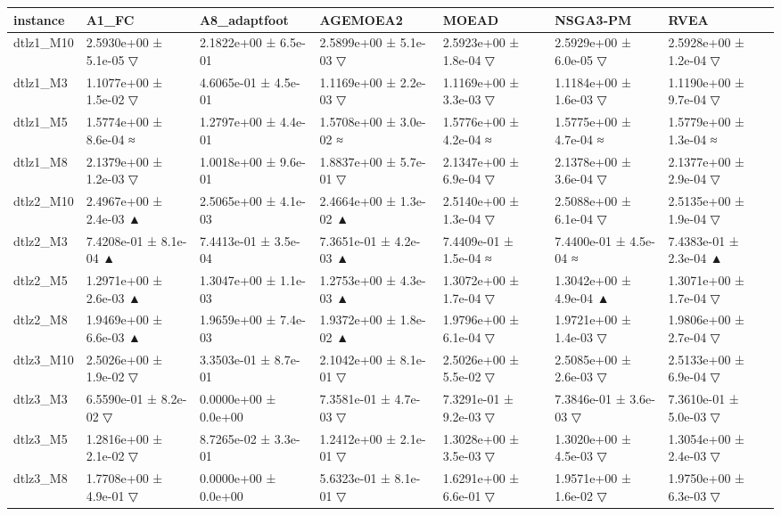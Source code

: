 \begin{tabular}{lllllll}
\toprule
instance & A1\_FC & A8\_adaptfoot & AGEMOEA2 & MOEAD & NSGA3-PM & RVEA \\
\midrule
dtlz1\_M10 & 2.5930e+00 ± 5.1e-05 ▽ & 2.1822e+00 ± 6.5e-01 & 2.5899e+00 ± 5.1e-03 ▽ & 2.5923e+00 ± 1.8e-04 ▽ & 2.5929e+00 ± 6.0e-05 ▽ & 2.5928e+00 ± 1.2e-04 ▽ \\
dtlz1\_M3 & 1.1077e+00 ± 1.5e-02 ▽ & 4.6065e-01 ± 4.5e-01 & 1.1169e+00 ± 2.2e-03 ▽ & 1.1169e+00 ± 3.3e-03 ▽ & 1.1184e+00 ± 1.6e-03 ▽ & 1.1190e+00 ± 9.7e-04 ▽ \\
dtlz1\_M5 & 1.5774e+00 ± 8.6e-04 ≈ & 1.2797e+00 ± 4.4e-01 & 1.5708e+00 ± 3.0e-02 ≈ & 1.5776e+00 ± 4.2e-04 ≈ & 1.5775e+00 ± 4.7e-04 ≈ & 1.5779e+00 ± 1.3e-04 ≈ \\
dtlz1\_M8 & 2.1379e+00 ± 1.2e-03 ▽ & 1.0018e+00 ± 9.6e-01 & 1.8837e+00 ± 5.7e-01 ▽ & 2.1347e+00 ± 6.9e-04 ▽ & 2.1378e+00 ± 3.6e-04 ▽ & 2.1377e+00 ± 2.9e-04 ▽ \\
dtlz2\_M10 & 2.4967e+00 ± 2.4e-03 ▲ & 2.5065e+00 ± 4.1e-03 & 2.4664e+00 ± 1.3e-02 ▲ & 2.5140e+00 ± 1.3e-04 ▽ & 2.5088e+00 ± 6.1e-04 ▽ & 2.5135e+00 ± 1.9e-04 ▽ \\
dtlz2\_M3 & 7.4208e-01 ± 8.1e-04 ▲ & 7.4413e-01 ± 3.5e-04 & 7.3651e-01 ± 4.2e-03 ▲ & 7.4409e-01 ± 1.5e-04 ≈ & 7.4400e-01 ± 4.5e-04 ≈ & 7.4383e-01 ± 2.3e-04 ▲ \\
dtlz2\_M5 & 1.2971e+00 ± 2.6e-03 ▲ & 1.3047e+00 ± 1.1e-03 & 1.2753e+00 ± 4.3e-03 ▲ & 1.3072e+00 ± 1.7e-04 ▽ & 1.3042e+00 ± 4.9e-04 ▲ & 1.3071e+00 ± 1.7e-04 ▽ \\
dtlz2\_M8 & 1.9469e+00 ± 6.6e-03 ▲ & 1.9659e+00 ± 7.4e-03 & 1.9372e+00 ± 1.8e-02 ▲ & 1.9796e+00 ± 6.1e-04 ▽ & 1.9721e+00 ± 1.4e-03 ▽ & 1.9806e+00 ± 2.7e-04 ▽ \\
dtlz3\_M10 & 2.5026e+00 ± 1.9e-02 ▽ & 3.3503e-01 ± 8.7e-01 & 2.1042e+00 ± 8.1e-01 ▽ & 2.5026e+00 ± 5.5e-02 ▽ & 2.5085e+00 ± 2.6e-03 ▽ & 2.5133e+00 ± 6.9e-04 ▽ \\
dtlz3\_M3 & 6.5590e-01 ± 8.2e-02 ▽ & 0.0000e+00 ± 0.0e+00 & 7.3581e-01 ± 4.7e-03 ▽ & 7.3291e-01 ± 9.2e-03 ▽ & 7.3846e-01 ± 3.6e-03 ▽ & 7.3610e-01 ± 5.0e-03 ▽ \\
dtlz3\_M5 & 1.2816e+00 ± 2.1e-02 ▽ & 8.7265e-02 ± 3.3e-01 & 1.2412e+00 ± 2.1e-01 ▽ & 1.3028e+00 ± 3.5e-03 ▽ & 1.3020e+00 ± 4.5e-03 ▽ & 1.3054e+00 ± 2.4e-03 ▽ \\
dtlz3\_M8 & 1.7708e+00 ± 4.9e-01 ▽ & 0.0000e+00 ± 0.0e+00 & 5.6323e-01 ± 8.1e-01 ▽ & 1.6291e+00 ± 6.6e-01 ▽ & 1.9571e+00 ± 1.6e-02 ▽ & 1.9750e+00 ± 6.3e-03 ▽ \\

\end{tabular}
